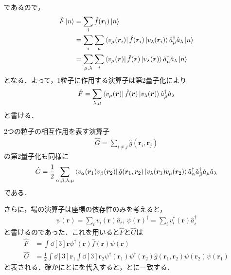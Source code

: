 \documentclass{report}
\begin{document}
であるので，
\begin{align}
  \hat{F}\ket{n} &= \sum_i \hat{f}(\bm{r}_i)\ket{n}\\
  &= \sum_{i}\sum_{\mu} \bra{v_\mu(\bm{r}_i)}\hat{f}(\bm{r}_i)\ket{v_\lambda(\bm{r}_i)}\hat{a}_\mu^{\dagger}\hat{a}_\lambda\ket{n}\\
  &= \sum_{\mu,\lambda}\sum_{i} \bra{v_\mu(\bm{r})}\hat{f}(\bm{r})\ket{v_\lambda(\bm{r})}\hat{a}_\mu^{\dagger}\hat{a}_\lambda\ket{n}\\
\end{align}
となる．よって，1粒子に作用する演算子は第2量子化により
\begin{align}
  \hat{F} = \sum_{\lambda,\mu} \bra{v_\mu(\bm{r})}\hat{f}(\bm{r})\ket{v_\lambda(\bm{r})}\hat{a}_\mu^{\dagger}\hat{a}_\lambda \label{f}
\end{align}
と書ける．

2つの粒子の相互作用を表す演算子
\begin{align}
  \hat{G} = \sum_{i\neq j} \hat{g}(\bm{r}_i,\bm{r}_j)
\end{align}
の第2量子化も同様に
\begin{align}
  \hat{G} = \frac{1}{2} \sum_{\alpha,\beta,\lambda,\mu} \bra{v_\alpha(\bm{r}_1)v_\beta(\bm{r}_2)}\hat{g}(\bm{r}_1,\bm{r}_2)\ket{v_\lambda(\bm{r}_1)v_\mu(\bm{r}_2)}\hat{a}_\alpha^{\dagger}\hat{a}_\beta^{\dagger}\hat{a}_\mu\hat{a}_\lambda \label{g}
\end{align}
である．

さらに，場の演算子は座標の依存性のみを考えると，
\begin{align}
  \psi(\bm{r}) = \sum_i v_i(\bm{r})\hat{a}_i,\ \psi(\bm{r})^{\dagger} = \sum_i v_i^*(\bm{r})\hat{a}_i^{\dagger} \label{field-v}
\end{align}
と書けるのであった．これを用いると$\hat{F}$と$\hat{G}$は
\begin{align}
  \hat{F} &= \int \dd[3]{\bm{r}}\psi^{\dagger}(\bm{r})\hat{f}(\bm{r})\psi(\bm{r}) \label{f-field} \\
  \hat{G} &= \frac{1}{2}\int\dd[3]{\bm{r}_1}\int\dd[3]{\bm{r}_2}\psi^{\dagger}(\bm{r}_1)\psi^{\dagger}(\bm{r}_2)\hat{g}(\bm{r}_1,\bm{r}_2)\psi(\bm{r}_2)\psi(\bm{r}_1) \label{g-field}
\end{align}
と表される．確かにとにを代入すると，とに一致する．
\end{document}
